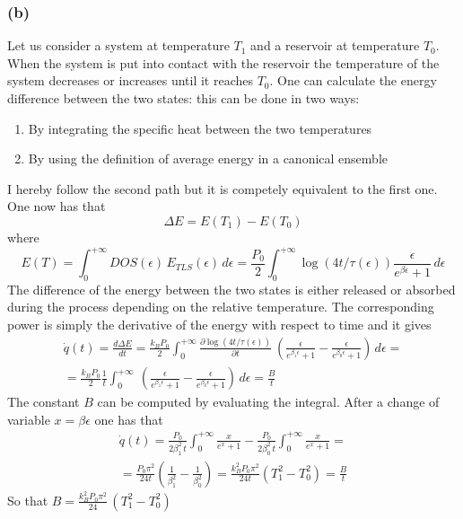 \documentclass{article}
\begin{document}
\subsubsection*{(b)}
Let us consider a system at temperature $T_1$ and a reservoir at temperature $T_0$. When the system is put into contact
with the reservoir the temperature of the system decreases or increases until it reaches $T_0$. One can calculate the energy difference between the two states: this can be done in two ways:
\begin{enumerate}
    \item By integrating the specific heat between the two temperatures
    \item By using the definition of average energy in a canonical ensemble
\end{enumerate}
I hereby follow the second path but it is competely equivalent to the first one. \\
One now has that
\begin{equation*}
    \Delta E = E(T_1) - E(T_0)
\end{equation*}
where 
\begin{equation*}
    E(T) = \int_0^{+\infty} DOS(\epsilon) \, E_{TLS}(\epsilon) \, d\epsilon = 
    \frac{P_0}{2}\int_0^{+\infty} \log(4t/\tau(\epsilon)) \frac{\epsilon }{e^{\beta\epsilon}+1} \, d\epsilon
\end{equation*}
The difference of the energy between the two states is either released or absorbed during the process depending on the relative temperature. The corresponding power is simply the derivative of
the energy with respect to time and it gives 
\begin{gather*}
    \dot q(t) = \frac{d \Delta E}{dt} = 
    \frac{k_BP_0}{2} \int_0^{+\infty} \frac{\partial \log(4t/\tau(\epsilon))}{\partial t} \ \left(\frac{\epsilon}{e^{\beta_1\epsilon} + 1} - \frac{\epsilon}{e^{\beta_0\epsilon} + 1} \right)\, d\epsilon = \\
    = \frac{k_BP_0}{2} \frac{1}{t} \int_0^{+\infty} \ \left(\frac{\epsilon}{e^{\beta_1\epsilon} + 1} - \frac{\epsilon}{e^{\beta_0\epsilon} + 1} \right) \, d\epsilon = \frac{B}{t} 
\end{gather*}
The constant $B$ can be computed by evaluating the integral. After a change of variable $x = \beta\epsilon$ one has that
\begin{gather*}
    \dot q(t) = \frac{P_0}{2\beta_1^2 \, t} \int_0^{+\infty} \frac{x}{e^x + 1} - \frac{P_0}{2\beta_0^2 \, t} \int_0^{+\infty} \frac{x}{e^x + 1} = \\
    = \frac{P_0\pi^2}{24t} \left(\frac{1}{\beta_1^2} - \frac{1}{\beta_0^2}\right) = 
    \frac{k_B^2P_0\pi^2}{24t} \left(T_1^2 - T_0^2\right) = \frac{B}{t}
\end{gather*} 
So that $B = \frac{k_B^2 P_0 \pi^2}{24} \, (T_1^2 - T_0^2)$
\end{document}
